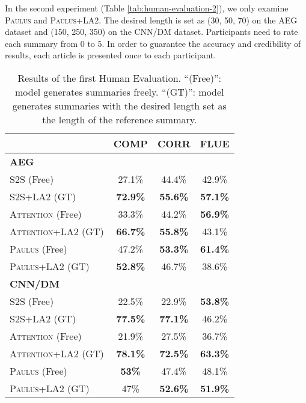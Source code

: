 \documentclass[11pt,a4paper]{article}
\begin{document}
In the second experiment (Table \ref{tab:human-evaluation-2}), we only examine \textsc{Paulus} and \textsc{Paulus+LA2}. The desired length is set as (30, 50, 70) on the AEG dataset and (150, 250, 350) on the CNN/DM dataset. Participants need to rate each summary from 0 to 5. In order to guarantee the accuracy and credibility of results, each article is presented once to each participant.
\begin{table}[!tp]
  \centering
  \footnotesize
  \begin{tabular}{lccc}
  \hline
& COMP & CORR & FLUE \\ \hline
  \textbf{AEG}                   &              &             &         \\\hdashline
  \textsc{S2S} (Free)        & 27.1\%        & 44.4\%       & 42.9\%   \\
  \textsc{S2S+LA2} (GT)      & \textbf{72.9\%}        & \textbf{55.6\%}       & \textbf{57.1\%}   \\\hdashline
  \textsc{Attention} (Free)     & 33.3\%        & 44.2\%       & \textbf{56.9\%}   \\
  \textsc{Attention+LA2} (GT) & \textbf{66.7\%}        & \textbf{55.8\%}       & 43.1\%   \\\hdashline
  \textsc{Paulus} (Free)         & 47.2\%        & \textbf{53.3\%}       & \textbf{61.4\%}   \\
  \textsc{Paulus+LA2} (GT)     & \textbf{52.8\%}        & 46.7\%       & 38.6\%   \\ \hline
  \textbf{CNN/DM}                &              &             &         \\\hdashline
  \textsc{S2S} (Free)        & 22.5\%        & 22.9\%       & \textbf{53.8\%}   \\
  \textsc{S2S+LA2} (GT)      & \textbf{77.5\%}        & \textbf{77.1\%}       & 46.2\%   \\\hdashline
  \textsc{Attention} (Free)     & 21.9\%        & 27.5\%       & 36.7\%   \\
  \textsc{Attention}+LA2 (GT) & \textbf{78.1\%}        & \textbf{72.5\%}       & \textbf{63.3\%}   \\\hdashline
  \textsc{Paulus} (Free)         & \textbf{53\%}        & 47.4\%       & 48.1\%   \\
  \textsc{Paulus+LA2} (GT)     & 47\%         & \textbf{52.6\%}       & \textbf{51.9\%}   \\ \hline
  \end{tabular}
  \caption{Results of the first Human Evaluation. ``(Free)'': model generates summaries freely. ``(GT)'': model generates summaries with the desired length set as the length of the reference summary.}
  \label{tab:human-evaluation-1}
  \end{table}
\end{document}
